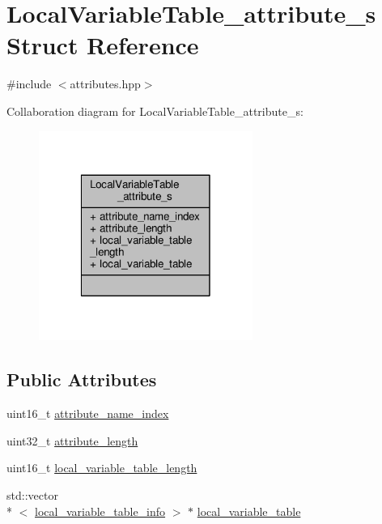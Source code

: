 \hypertarget{structLocalVariableTable__attribute__s}{\section{Local\+Variable\+Table\+\_\+attribute\+\_\+s Struct Reference}
\label{structLocalVariableTable__attribute__s}
}


{\ttfamily \#include $<$attributes.\+hpp$>$}



Collaboration diagram for Local\+Variable\+Table\+\_\+attribute\+\_\+s\+:\nopagebreak
\begin{figure}[H]
\begin{center}
\leavevmode
\includegraphics[width=198pt]{structLocalVariableTable__attribute__s__coll__graph}
\end{center}
\end{figure}
\subsection*{Public Attributes}
\begin{DoxyCompactItemize}
\item 
uint16\+\_\+t \hyperlink{structLocalVariableTable__attribute__s_ae575c0e871e3ce914f67b99e05ecae55}{attribute\+\_\+name\+\_\+index}
\item 
uint32\+\_\+t \hyperlink{structLocalVariableTable__attribute__s_a9a3749b259b8912534c5cce4e4582107}{attribute\+\_\+length}
\item 
uint16\+\_\+t \hyperlink{structLocalVariableTable__attribute__s_ac48b8efc7da2e7b280f3c592cc201888}{local\+\_\+variable\+\_\+table\+\_\+length}
\item 
std\+::vector\\*
$<$ \hyperlink{attributes_8hpp_ac0faec3264719598fb702dbf93bbd46f}{local\+\_\+variable\+\_\+table\+\_\+info} $>$ $\ast$ \hyperlink{structLocalVariableTable__attribute__s_a5f3a593bf6cb743eba9590a81822b739}{local\+\_\+variable\+\_\+table}
\end{DoxyCompactItemize}


